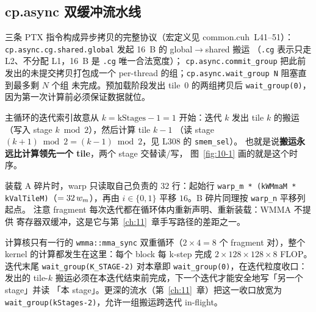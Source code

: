 \subsection{cp.async 双缓冲流水线}



三条 PTX 指令构成异步拷贝的完整协议（宏定义见 common.cuh~L41--51）：
\texttt{cp.\allowbreak{}async.\allowbreak{}cg.\allowbreak{}shared.\allowbreak{}global} 发起 16~B 的 global$\to$shared 搬运
（\texttt{.cg} 表示只走 L2、不分配 L1，16~B 是 \texttt{.cg} 唯一合法宽度）；
\texttt{cp.\allowbreak{}async.\allowbreak{}commit\_\allowbreak{}group} 把此前发出的未提交拷贝打包成一个
per-thread 的组；\texttt{cp.\allowbreak{}async.\allowbreak{}wait\_\allowbreak{}group N} 阻塞直到最多剩 $N$ 个组
未完成。预加载阶段发出 tile~0 的两组拷贝后 \texttt{wait\_\allowbreak{}group\allowbreak{}(0)}，
因为第一次计算前必须保证数据就位。



主循环的迭代索引故意从 $k = \mathrm{kStages}-1 = 1$ 开始：迭代 $k$ 发出
tile $k$ 的搬运（写入 stage $k \bmod 2$），然后计算 tile $k-1$
（读 stage $(k+1)\bmod 2 = (k-1)\bmod 2$，见 L308 的 \texttt{smem\_sel}）。
也就是说\textbf{搬运永远比计算领先一个 tile}，两个 stage 交替读/写，
图~\ref{fig:10-1} 画的就是这个时序。



装载 A 碎片时，warp 只读取自己负责的 $32$ 行：起始行
\texttt{warp\_\allowbreak{}m * \allowbreak{}(kWMmaM * kValTileM)}（$=32\,w\sb m$），再由
$i\in\{0,1\}$ 平移 $16$。B 碎片同理按 \texttt{warp\_n} 平移列起点。
注意 fragment 每次迭代都在循环体内重新声明、重新装载：WMMA 不提供
寄存器双缓冲，这是它与第~\ref{ch:11}~章手写路径的差距之一。



计算核只有一行的 \texttt{wmma::\allowbreak{}mma\_\allowbreak{}sync} 双重循环（$2\times4=8$ 个
fragment 对），整个 kernel 的计算都发生在这里：每个 block 每 k-step 完成
$2\times128\times128\times8$ FLOP。迭代末尾 \texttt{wait\_\allowbreak{}group\allowbreak{}(K\_\allowbreak{}STAGE-2)}
对本章即 \texttt{wait\_\allowbreak{}group\allowbreak{}(0)}，在迭代粒度收口：发出的 tile-$k$
搬运必须在本迭代结束前完成，下一个迭代才能安全地写「另一个 stage」并读
「本 stage」。更深的流水（第~\ref{ch:11}~章）把这一收口放宽为
\texttt{wait\_\allowbreak{}group\allowbreak{}(k\allowbreak{}Stages-2)}，允许一组搬运跨迭代 in-flight。

